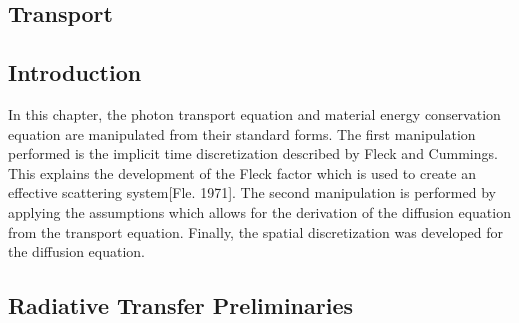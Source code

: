
\begin{center}
\section{Transport}
\label{sec:Transport}
\end{center}

\aboveSubSecSkip

\subsection{Introduction}
\label{sec:Transport-Intro}

\noindent
	\indent In this chapter, the photon transport equation and material energy conservation equation are manipulated from their standard forms. The first manipulation performed is the implicit time discretization described by Fleck and Cummings. This explains the development of the Fleck factor which is used to create an effective scattering system[Fle. 1971]. The second manipulation is performed by applying the assumptions which allows for the derivation of the diffusion equation from the transport equation. Finally, the spatial discretization was developed for the diffusion equation.
			
\belowSubSecSkip

\subsection{Radiative Transfer Preliminaries}
\label{sec:Transport-Radiative-Transfer-Preliminaries}

